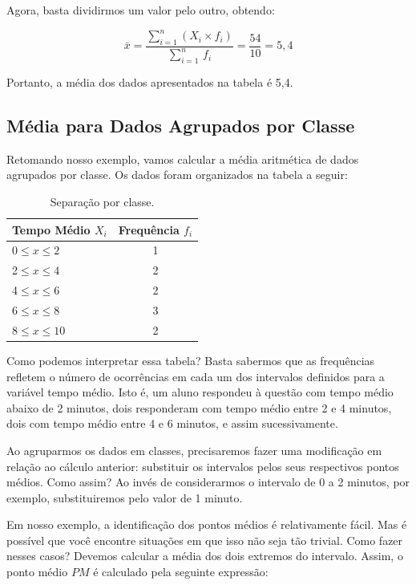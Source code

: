 Agora, basta dividirmos um valor pelo outro, obtendo:

\[
    \bar{x}=\frac{\sum_{i=1}^{n}(X_i\times f_i)}{\sum_{i=1}^{n}\,f_i}=\frac{54}{10}=5,4
\]

Portanto, a média dos dados apresentados na tabela é 5,4.

\subsection{Média para Dados Agrupados por Classe}

Retomando nosso exemplo, vamos calcular a média aritmética de dados agrupados por classe. Os dados foram organizados na tabela a seguir:

\begin{table}[H]
    \centering
\begin{tabular}{lc}
\toprule
\shortstack{Tempo \\Médio \(X_i\)} &Frequência \(f_i\)\\
\midrule
0\(\leq x \le 2\)      &1\\
2\(\leq x \le 4\)      &2\\
4\(\leq x \le 6\)      &2\\
6\(\leq x \le 8\)      &3\\
8\(\leq x \le 10\)     &2\\
\bottomrule
\end{tabular}
\caption{Separação por classe.}
\end{table}

Como podemos interpretar essa tabela? Basta sabermos que as frequências refletem o número de ocorrências em cada um dos intervalos definidos para a variável tempo médio. Isto é, um aluno respondeu à questão com tempo médio abaixo de 2 minutos, dois responderam com tempo médio entre 2 e 4 minutos, dois com tempo médio entre 4 e 6 minutos, e assim sucessivamente.

Ao agruparmos os dados em classes, precisaremos fazer uma modificação em relação ao cálculo anterior: substituir os intervalos pelos seus respectivos pontos médios. Como assim? Ao invés de considerarmos o intervalo de 0 a 2 minutos, por exemplo, substituiremos pelo valor de 1 minuto.

Em nosso exemplo, a identificação dos pontos médios é relativamente fácil. Mas é possível que você encontre situações em que isso não seja tão trivial. Como fazer nesses casos? Devemos calcular a média dos dois extremos do intervalo. Assim, o ponto médio \(PM\) é calculado pela seguinte expressão:

